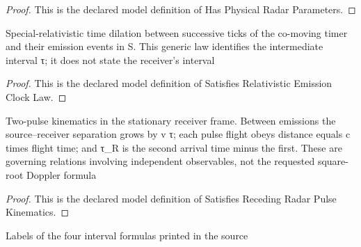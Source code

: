 \begin{proof}
  This is the declared model definition of Has Physical Radar Parameters.
\end{proof}
\begin{definition}
  \label{def:physics:phyx-mini-0593:phyxminiproblems-problemphyxmini0593-satisfiesrelativisticemissionclocklaw}
  Special-relativistic time dilation between successive ticks of the co-moving timer and their emission events in S. This generic law identifies the intermediate interval τ; it does not state the receiver's interval
\end{definition}
\begin{proof}
  This is the declared model definition of Satisfies Relativistic Emission Clock Law.
\end{proof}
\begin{definition}
  \label{def:physics:phyx-mini-0593:phyxminiproblems-problemphyxmini0593-satisfiesrecedingradarpulsekinematics}
  Two-pulse kinematics in the stationary receiver frame. Between emissions the source--receiver separation grows by v τ; each pulse flight obeys distance equals c times flight time; and τ\_R is the second arrival time minus the first. These are governing relations involving independent observables, not the requested square-root Doppler formula
\end{definition}
\begin{proof}
  This is the declared model definition of Satisfies Receding Radar Pulse Kinematics.
\end{proof}
\begin{definition}
  \label{def:physics:phyx-mini-0593:phyxminiproblems-problemphyxmini0593-answerchoice}
  Labels of the four interval formulas printed in the source
\end{definition}
